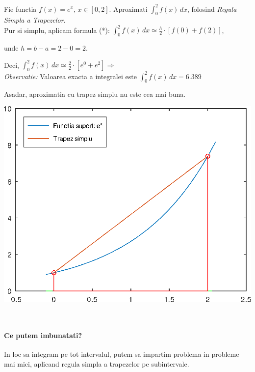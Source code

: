\documentclass{article}
\begin{document}
\tabto{0.5cm}\begin{minipage}{0.7\textwidth}
    \vspace{0.5cm}\tabto{0.5cm} Fie functia $f(x) = e^x$, $x \in [0, 2]$. Aproximati $\int_0^2 f(x)\, dx$, folosind \textit{Regula Simpla a Trapezelor}. \\
    
    \tabto{0.5cm} Pur si simplu, aplicam formula (*):
    $\int_0^2 f(x)\, dx \simeq \frac{h}{2} \cdot [f(0) + f(2)]$,
    
    \hspace{0.5cm}unde $h = b-a = 2-0 = 2$. 
    
    \tabto{0.5cm} Deci, $\int_0^2 f(x)\, dx \simeq \frac{2}{2} \cdot [e^0 + e^2] \Longrightarrow$  \\
    
    \tabto{0.5cm} \textit{Observatie:} Valoarea exacta a integralei este $\int_0^2 f(x)\, dx = 6.389$
    
    \tabto{0.5cm} Asadar, aproximatia cu trapez simplu nu este cea mai buna.
\end{minipage}\hspace{0.5cm}
\begin{minipage}{0.5\textwidth}
    \includegraphics[scale=0.4]{trapez_simplu_ex}
\end{minipage}\\

\paragraph{Ce putem imbunatati?}
\tabto{0.5cm} In loc sa integram pe tot intervalul, putem sa impartim problema in probleme mai mici, aplicand regula simpla a trapezelor pe subintervale.
\end{document}
